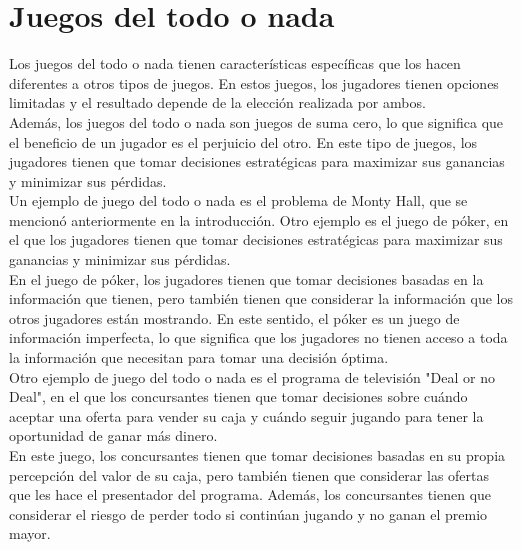 \section{Juegos del todo o nada}

Los juegos del todo o nada tienen características específicas que los hacen diferentes a otros tipos 
de juegos. En estos juegos, los jugadores tienen opciones limitadas y el resultado depende de la 
elección realizada por ambos.\\

Además, los juegos del todo o nada son juegos de suma cero, lo que significa que el beneficio de un 
jugador es el perjuicio del otro. En este tipo de juegos, los jugadores tienen que tomar decisiones 
estratégicas para maximizar sus ganancias y minimizar sus pérdidas.\\

Un ejemplo de juego del todo o nada es el problema de Monty Hall, que se mencionó anteriormente 
en la introducción. Otro ejemplo es el juego de póker, en el que los jugadores tienen que tomar 
decisiones estratégicas para maximizar sus ganancias y minimizar sus pérdidas.\\

En el juego de póker, los jugadores tienen que tomar decisiones basadas en la información que tienen, 
pero también tienen que considerar la información que los otros jugadores están mostrando.
En este sentido, el póker es un juego de información imperfecta, lo que significa que los jugadores 
no tienen acceso a toda la información que necesitan para tomar una decisión óptima.\\

Otro ejemplo de juego del todo o nada es el programa de televisión "Deal or no Deal", en el que 
los concursantes tienen que tomar decisiones sobre cuándo aceptar una oferta para vender su caja y
cuándo seguir jugando para tener la oportunidad de ganar más dinero.\\

En este juego, los concursantes tienen que tomar decisiones basadas en su propia percepción del 
valor de su caja, pero también tienen que considerar las ofertas que les hace el presentador del
programa. Además, los concursantes tienen que considerar el riesgo de perder todo si continúan 
jugando y no ganan el premio mayor.
